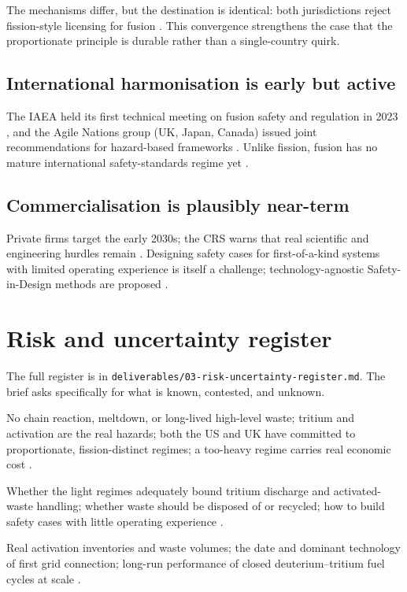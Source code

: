 \documentclass[11pt,a4paper]{article}
\begin{document}
\noindent The mechanisms differ, but the destination is identical: both
jurisdictions reject fission-style licensing for fusion
\citep{nrc2023vote,ukfusionregfactsheet}. This convergence strengthens the case
that the proportionate principle is durable rather than a single-country quirk.

\subsection{International harmonisation is early but active}
The IAEA held its first technical meeting on fusion safety and regulation in 2023
\citep{iaea2023meeting}, and the Agile Nations group (UK, Japan, Canada) issued
joint recommendations for hazard-based frameworks \citep{agilenations2023}.
Unlike fission, fusion has no mature international safety-standards regime yet
\citep{iaeafusionsafety}.

\subsection{Commercialisation is plausibly near-term}
Private firms target the early 2030s; the CRS warns that real scientific and
engineering hurdles remain \citep{crs2026fusion}. Designing safety cases for
first-of-a-kind systems with limited operating experience is itself a challenge;
technology-agnostic Safety-in-Design methods are proposed
\citep{sidmethodology2026}.

\section{Risk and uncertainty register}

The full register is in \texttt{deliverables/03-risk-uncertainty-register.md}.
The brief asks specifically for what is known, contested, and unknown.

\begin{description}[leftmargin=1.2em]
  \item[Known --- act confidently.] No chain reaction, meltdown, or long-lived
  high-level waste; tritium and activation are the real hazards; both the US and
  UK have committed to proportionate, fission-distinct regimes; a too-heavy
  regime carries real economic cost
  \citep{iterstafetybasis,ukfusionregfactsheet,nrc2023vote,crs2026fusion}.
  \item[Contested --- design for adaptability.] Whether the light regimes
  adequately bound tritium discharge and activated-waste handling; whether waste
  should be disposed of or recycled; how to build safety cases with little
  operating experience
  \citep{iaeatritiumharmonization,radwasterecycling2023,sidmethodology2026}.
  \item[Unknown --- resolve by monitoring.] Real activation inventories and waste
  volumes; the date and dominant technology of first grid connection; long-run
  performance of closed deuterium--tritium fuel cycles at scale
  \citep{tritiumbreeding2018,crs2026fusion,iaeatecdoc2049}.
\end{description}
\end{document}
